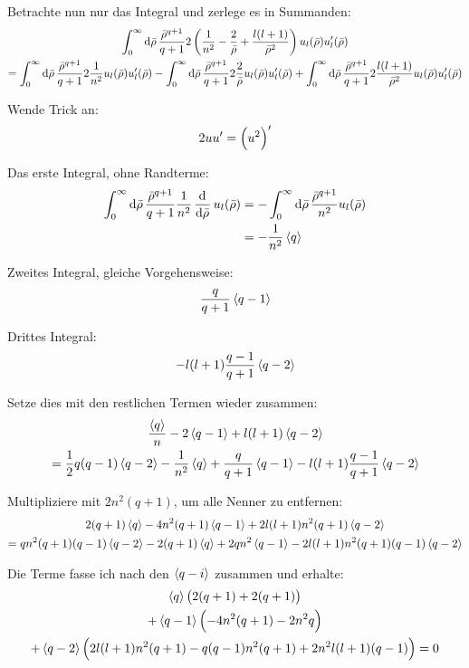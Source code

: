 Betrachte nun nur das Integral und zerlege es in Summanden:
\begin{gather*}
	\int_0^\infty \dif \bar\rho \,
	\frac{\bar\rho^{q+1}}{q+1} 2 \del{\frac1{n^2} - \frac2{\bar\rho}
	+ \frac{l(l+1)}{\bar\rho^2}} u_l(\bar\rho) u'_l(\bar\rho) \\
	=
	\int_0^\infty \dif \bar\rho \,
	\frac{\bar\rho^{q+1}}{q+1} 2
	\frac1{n^2}
	u_l(\bar\rho) u'_l(\bar\rho)
	-
	\int_0^\infty \dif \bar\rho \,
	\frac{\bar\rho^{q+1}}{q+1} 2
	\frac2{\bar\rho}
	u_l(\bar\rho) u'_l(\bar\rho)
	+
	\int_0^\infty \dif \bar\rho \,
	\frac{\bar\rho^{q+1}}{q+1} 2
	\frac{l(l+1)}{\bar\rho^2}
	u_l(\bar\rho) u'_l(\bar\rho)
\end{gather*}

Wende Trick an:
\[
	2 u u' = \del{u^2}'
\]

Das erste Integral, ohne Randterme:
\begin{align*}
	\int_0^\infty \dif \bar\rho \,
	\frac{\bar\rho^{q+1}}{q+1}
	\frac1{n^2}
	\dod{}{\bar\rho} u_l(\bar\rho)
	&= 
	-
	\int_0^\infty \dif \bar\rho \,
	\frac{\bar\rho^{q+1}}{n^2}
	u_l(\bar\rho) \\
	&= - \frac{1}{n^2} \bracket q
\end{align*}

Zweites Integral, gleiche Vorgehensweise:
\[
	\frac{q}{q+1} \left\langle q-1 \right\rangle
\]

Drittes Integral:
\[
	- l(l+1) \frac{q-1}{q+1} \left\langle q-2 \right\rangle
\]

Setze dies mit den restlichen Termen wieder zusammen:
\begin{gather*}
	\frac{\left\langle q \right\rangle}n - 2 \left\langle q-1 \right\rangle + l(l+1) \left\langle q-2 \right\rangle \\
	= \frac 12 q (q-1) \left\langle q-2 \right\rangle
	- \frac{1}{n^2} \left\langle q \right\rangle
	+ \frac{q}{q+1} \left\langle q-1 \right\rangle
	- l(l+1) \frac{q-1}{q+1} \left\langle q-2 \right\rangle
\end{gather*}

Multipliziere mit $2n^2(q+1)$, um alle Nenner zu entfernen:
\begin{gather*}
	2 (q+1) \left\langle q \right\rangle
	- 4 n^2 (q+1) \left\langle q-1 \right\rangle
	+ 2 l(l+1) n^2 (q+1) \left\langle q-2 \right\rangle \\
	= q n^2 (q+1) (q-1) \left\langle q-2 \right\rangle
	- 2 (q+1) \left\langle q \right\rangle
	+ 2 q n^2 \left\langle q-1 \right\rangle
	- 2 l(l+1) n^2 (q+1) (q-1) \left\langle q-2 \right\rangle
\end{gather*}

Die Terme fasse ich nach den $\left\langle q-i \right\rangle$ zusammen und erhalte:
\begin{gather*}
	\bracket q
	\del{
		2(q+1) + 2(q+1)
	} \\
	+
	\bracket{q-1}
	\del{
		-4n^2 (q+1) - 2n^2 q
	} \\
	+
	\bracket{q-2}
	\del{
		2l(l+1)n^2(q+1) - q (q-1) n^2 (q+1) + 2 n^2 l(l+1) (q-1)
	}
	= 0
\end{gather*}

